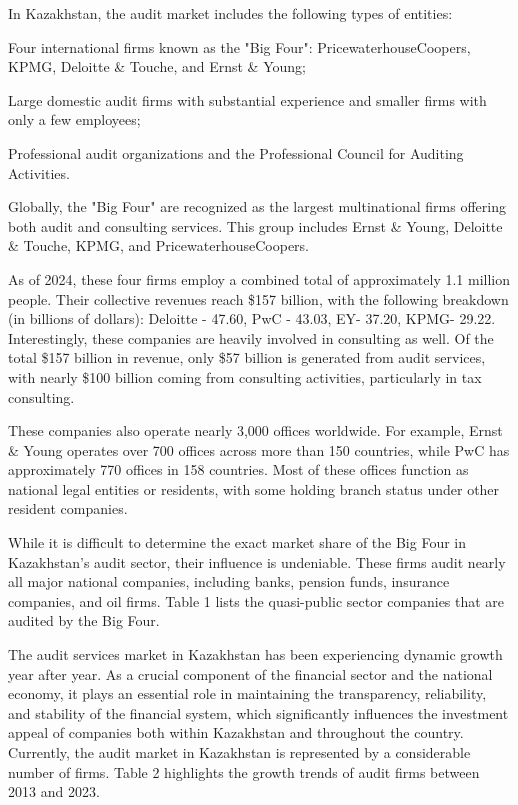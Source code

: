 \begin{multicols}{2}
In Kazakhstan, the audit market includes the following types of
entities:

Four international firms known as the "Big Four":
PricewaterhouseCoopers, KPMG, Deloitte \& Touche, and Ernst \& Young;

Large domestic audit firms with substantial experience and smaller firms
with only a few employees;

Professional audit organizations and the Professional Council for
Auditing Activities.

Globally, the "Big Four" are recognized as the largest multinational
firms offering both audit and consulting services. This group includes
Ernst \& Young, Deloitte \& Touche, KPMG, and PricewaterhouseCoopers.

As of 2024, these four firms employ a combined total of approximately
1.1 million people. Their collective revenues reach \$157 billion, with
the following breakdown (in billions of dollars): Deloitte - 47.60, PwC
- 43.03, EY- 37.20, KPMG- 29.22. Interestingly, these companies are
heavily involved in consulting as well. Of the total \$157 billion in
revenue, only \$57 billion is generated from audit services, with nearly
\$100 billion coming from consulting activities, particularly in tax
consulting.

These companies also operate nearly 3,000 offices worldwide. For
example, Ernst \& Young operates over 700 offices across more than 150
countries, while PwC has approximately 770 offices in 158 countries.
Most of these offices function as national legal entities or residents,
with some holding branch status under other resident companies.

While it is difficult to determine the exact market share of the Big
Four in Kazakhstan's audit sector, their influence is undeniable. These
firms audit nearly all major national companies, including banks,
pension funds, insurance companies, and oil firms. Table 1 lists the
quasi-public sector companies that are audited by the Big Four.

The audit services market in Kazakhstan has been experiencing dynamic
growth year after year. As a crucial component of the financial sector
and the national economy, it plays an essential role in maintaining the
transparency, reliability, and stability of the financial system, which
significantly influences the investment appeal of companies both within
Kazakhstan and throughout the country. Currently, the audit market in
Kazakhstan is represented by a considerable number of firms. Table 2
highlights the growth trends of audit firms between 2013 and 2023.

\end{multicols}


